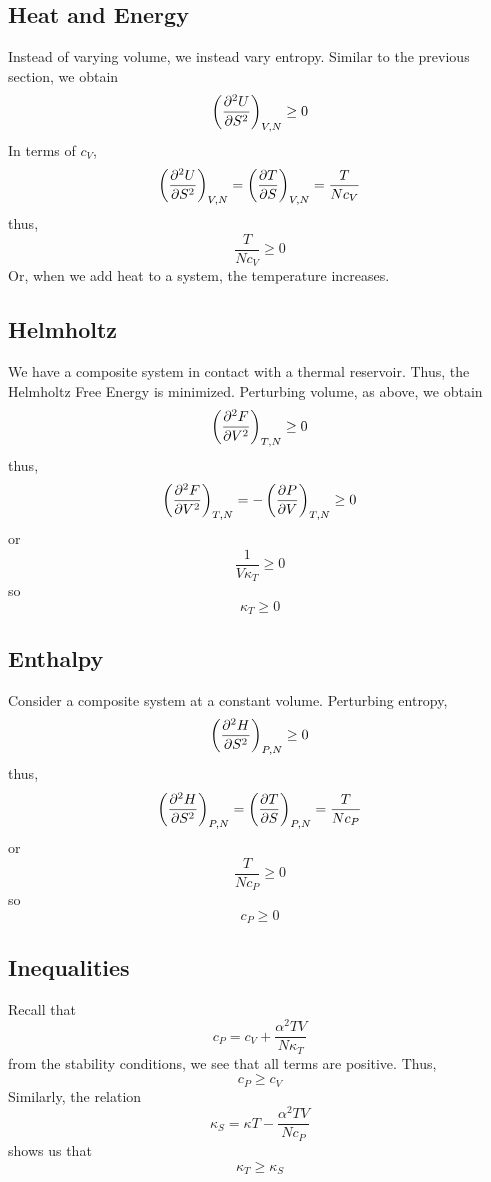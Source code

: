\subsection{Heat and Energy}
Instead of varying volume, we instead vary entropy. Similar to the previous section, we obtain
\begin{equation}
	\left(\frac{\partial ^2U}{\partial S^2}\right)_{V,N}\geq0
\end{equation}
In terms of \(c_V\),
\[\left(\frac{\partial ^2U}{\partial S^2}\right)_{V,N}=\left(\frac{\partial T}{\partial S}\right)_{V,N}=\frac{T}{Nc_V}\]
thus,
\begin{equation}
	\frac{T}{Nc_V}\geq0
\end{equation}
Or, when we add heat to a system, the temperature increases.

\subsection{Helmholtz}
We have a composite system in contact with a thermal reservoir. Thus, the Helmholtz Free Energy is minimized. Perturbing volume, as above, we obtain
\begin{equation}
	\left(\frac{\partial ^2F}{\partial V^2}\right)_{T,N}\geq0
\end{equation}
thus,
\[\left(\frac{\partial ^2F}{\partial V^2}\right)_{T,N}=-\left(\frac{\partial P}{\partial V}\right)_{T,N}\geq0\]
or
\begin{equation}
	\frac{1}{V\kappa_T}\geq0
\end{equation}
so
\begin{equation}
	\kappa_T\geq0
\end{equation}

\subsection{Enthalpy}
Consider a composite system at a constant volume. Perturbing entropy,
\begin{equation}
	\left(\frac{\partial ^2H}{\partial S^2}\right)_{P,N}\geq0
\end{equation}
thus,
\[\left(\frac{\partial ^2H}{\partial S^2}\right)_{P,N}=\left(\frac{\partial T}{\partial S}\right)_{P,N}=\frac{T}{Nc_P}\]
or
\begin{equation}
	\frac{T}{Nc_P}\geq0
\end{equation}
so
\begin{equation}
	c_P\geq0
\end{equation}

\subsection{Inequalities}
Recall that 
\[c_P=c_V+\frac{\alpha^2TV}{N\kappa_T}\]
from the stability conditions, we see that all terms are positive. Thus,
\begin{equation}
	c_P\geq c_V
\end{equation}
Similarly, the relation
\begin{equation}
	\kappa_S=\kappa T-\frac{\alpha^2TV}{Nc_P}
\end{equation}
shows us that
\begin{equation}
	\kappa_T\geq \kappa_S
\end{equation}

